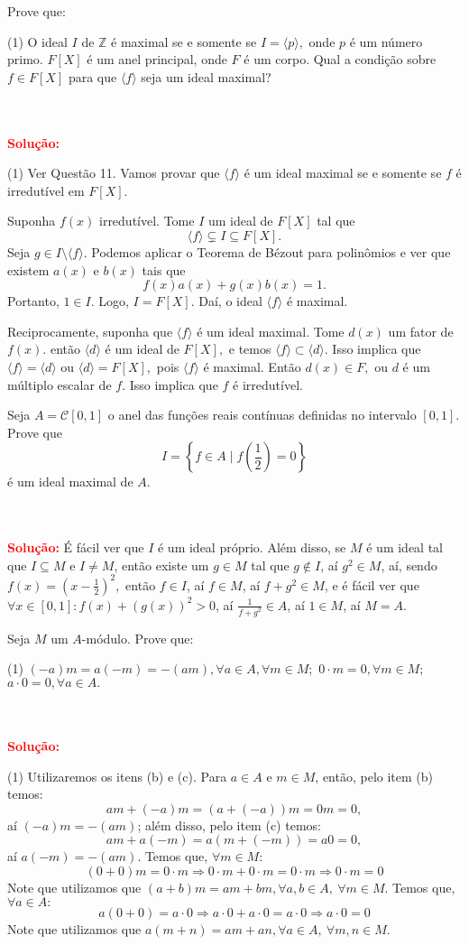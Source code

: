 \documentclass[11pt,a4paper]{article}
\newcounter{exercicio}[section]
\newcommand{\dividiritens}[1]{\begin{tasks}[counter-format={(tsk[a])},label-width=3.6ex, label-format = {\bfseries}, column-sep = {0pt}](1) #1 \end{tasks}}
\newcommand{\pers}[1]{\textcolor{Floresta}{$\negrito{(#1)} $}}
\newcommand{\solucao}[1]{
\textbf{\textcolor{white}{oi}\\ \\ \textcolor{red}{Solução:}} #1}
\begin{document}
 Prove que: 
\dividiritens{
\task[\pers{a}] O ideal $I$ de $\mathbb{Z}$ é maximal se e somente se $I = \langle p \rangle,$ onde $p$ é um número primo.
\task[\pers{b}] $F[X]$ é um anel principal, onde $F$ é um corpo. Qual a condição sobre $f \in F[X]$ para que $\langle f \rangle$ seja um ideal maximal?
}
\solucao{
\dividiritens{
\task[\pers{a}] Ver Questão 11.
\task[\pers{b}] Vamos provar que $\langle f \rangle$ é um ideal maximal se e somente se $f$ é irredutível em $F[X].$

Suponha $f(x)$ irredutível. Tome $I$ um ideal de $F[X]$ tal que 
\[
\langle f \rangle \subsetneq I \subseteq F[X].
\]
Seja $g \in I \setminus \langle f \rangle.$ Podemos aplicar o Teorema de Bézout para polinômios e ver que existem $a(x)$ e $b(x)$ tais que
\[
f(x)a(x) + g(x)b(x) = 1.
\]
Portanto, $1 \in I.$ Logo, $I = F[X].$ Daí, o ideal $\langle f \rangle$ é maximal.

Reciprocamente, suponha que $\langle f \rangle$ é um ideal maximal. Tome $d(x)$ um fator de $f(x).$ então $\langle d \rangle$ é um ideal de $F[X],$ e temos $\langle f \rangle \subset \langle d \rangle.$ Isso implica que $\langle f \rangle = \langle d \rangle$ ou $\langle d \rangle = F[X],$ pois $\langle f \rangle$ é maximal. Então $d(x) \in F,$ ou $d$ é um múltiplo escalar de $f.$ Isso implica que $f$ é irredutível.
}
}
 Seja $A = \mathcal{C}[0, 1]$ o anel das funções reais contínuas definidas no intervalo $[0, 1].$ Prove que 
\[I = \left\{f \in A \mid f \left(\frac{1}{2} \right) = 0 \right\}\]
é um ideal maximal de $A.$ 
\solucao{
É fácil ver que $I$ é um ideal próprio. Além disso, se $M$ é um ideal tal que $I\subseteq M$ e $I\neq M$, então existe um $g\in M$ tal que $g\notin I$, aí $g^2\in M$, aí, sendo $f(x)=\left(x-\frac{1}{2}\right)^2,$ então $f\in I$, aí $f\in M$, aí $f+g^2\in M$, e é fácil ver que $\forall x\in[0,1]:f(x)+(g(x))^2>0$, aí $\frac{1}{f+g^2}\in A$, aí $1\in M$, aí $M=A$.
}
 Seja $M$ um $A$-módulo. Prove que:
\dividiritens{
\task[\pers{a}] $(-a)m = a(-m) = -(am), \forall a \in A, \forall m \in M;$
\task[\pers{b}] $0 \cdot m = 0, \forall m \in M;$
\task[\pers{c}] $a \cdot 0 = 0, \forall a \in A.$
}
\solucao{
\dividiritens{
\task[\pers{a}] Utilizaremos os itens (b) e (c). Para $a\in A$ e $m\in M$, então, pelo item (b) temos:
\[
am+(-a)m=(a+(-a))m=0m=0,
\]
aí $(-a)m=-(am)$; além disso, pelo item (c) temos:
\[
am+a(-m)=a(m+(-m))=a0=0,
\]
aí $a(-m)=-(am)$.
\task[\pers{b}] Temos que, $\forall m \in M:$
\[
(0+0)m = 0 \cdot m \Rightarrow 0 \cdot m + 0 \cdot m = 0 \cdot m \Rightarrow 0 \cdot m = 0
\]
Note que utilizamos que $(a+b)m = am + bm, \forall a,b \in A, \ \forall m \in M.$
\task[\pers{c}] Temos que, $\forall a \in A:$
\[
a(0+0) = a \cdot 0 \Rightarrow a \cdot 0 + a \cdot 0 = a \cdot 0  \Rightarrow a \cdot 0 = 0
\]
Note que utilizamos que $a(m+n) = am + an, \forall a \in A, \ \forall m,n \in M.$
}
}
\end{document}
